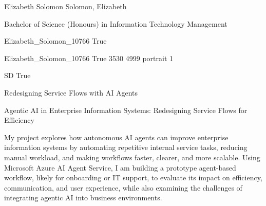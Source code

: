 
\begingroup{}\relax



\def\Key{Elizabeth_Solomon_10766}

{Elizabeth Solomon}
{Solomon, Elizabeth}

{Bachelor of Science (Honours) in Information Technology Management}

{Elizabeth_Solomon_10766}
{True}

{Elizabeth_Solomon_10766}
{True}
{3530}
{4999}
{portrait}
{1}

{SD}
{True}

{Redesigning Service Flows with AI Agents}

{Agentic AI in Enterprise Information Systems: Redesigning Service Flows for Efficiency}

{My project explores how autonomous AI agents can improve enterprise information systems by automating repetitive internal service tasks, reducing manual workload, and making workflows faster, clearer, and more scalable. Using Microsoft Azure AI Agent Service, I am building a prototype agent-based workflow, likely for onboarding or IT support, to evaluate its impact on efficiency, communication, and user experience, while also examining the challenges of integrating agentic AI into business environments.}


